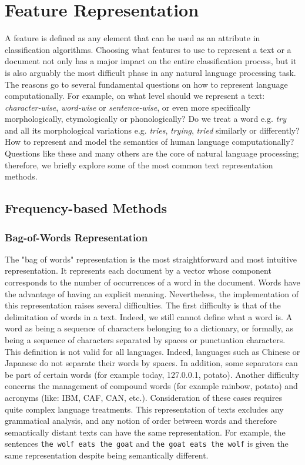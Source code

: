 \section{Feature Representation}

A feature is defined as any element that can be used as an attribute in classification algorithms. Choosing what features to use to represent a text or a document not only has a major impact on the entire classification process, but it is also arguably the most difficult phase in any natural language processing task. The reasons go to several fundamental questions on how to represent language computationally. For example, on what level should we represent a text: \emph{character-wise}, \emph{word-wise} or \emph{sentence-wise}, or even more specifically morphologically, etymologically or phonologically? Do we treat a word e.g. \emph{try} and all its morphological variations e.g. \emph{tries}, \emph{trying}, \emph{tried} similarly or differently? How to represent and model the semantics of human language computationally? Questions like these and many others are the core of natural language processing; therefore, we briefly explore some of the most common text representation methods.

\subsection{Frequency-based Methods}

\subsubsection{Bag-of-Words Representation}

The "bag of words" representation is the most straightforward and most intuitive
representation. It represents each document by a vector
whose component corresponds to the number of occurrences of a word in
the document.  Words have the advantage of having an
explicit meaning. Nevertheless, the implementation of this
representation raises several difficulties. The first difficulty is that
of the delimitation of words in a text. Indeed, we still cannot define
what a word is. A word as being a sequence of
characters belonging to a dictionary, or formally, as being a sequence
of characters separated by spaces or punctuation characters. This
definition is not valid for all languages. Indeed, languages such as
Chinese or Japanese do not separate their words by spaces. In addition, some separators can be part of certain words (for example today,
127.0.0.1, potato). Another difficulty concerns the management of
compound words (for example rainbow, potato) and acronyms (like:
IBM, CAF, CAN, etc.). Consideration of these cases requires quite
complex language treatments. This representation of texts excludes any
grammatical analysis, and any notion of order between words and therefore
semantically distant texts can have the same representation. For
example, the sentences \texttt{the\ wolf\ eats\ the\ goat} and
\texttt{the\ goat\ eats\ the\ wolf} is given the same representation
despite being semantically different.

